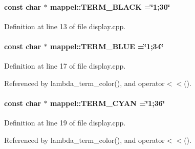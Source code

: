 \paragraph[{\texorpdfstring{T\+E\+R\+M\+\_\+\+B\+L\+A\+CK}{TERM_BLACK}}]{\setlength{\rightskip}{0pt plus 5cm}const char $\ast$ mappel\+::\+T\+E\+R\+M\+\_\+\+B\+L\+A\+CK =\char`\"{}1;30\char`\"{}}\hypertarget{namespacemappel_a448ca8ea08b3b9cdf522884ac004d901}{}\label{namespacemappel_a448ca8ea08b3b9cdf522884ac004d901}


Definition at line 13 of file display.\+cpp.

\paragraph[{\texorpdfstring{T\+E\+R\+M\+\_\+\+B\+L\+UE}{TERM_BLUE}}]{\setlength{\rightskip}{0pt plus 5cm}const char $\ast$ mappel\+::\+T\+E\+R\+M\+\_\+\+B\+L\+UE =\char`\"{}1;34\char`\"{}}\hypertarget{namespacemappel_a04365b9f87e9c572c79e2da4ff4a0378}{}\label{namespacemappel_a04365b9f87e9c572c79e2da4ff4a0378}


Definition at line 17 of file display.\+cpp.



Referenced by lambda\+\_\+term\+\_\+color(), and operator$<$$<$().

\paragraph[{\texorpdfstring{T\+E\+R\+M\+\_\+\+C\+Y\+AN}{TERM_CYAN}}]{\setlength{\rightskip}{0pt plus 5cm}const char $\ast$ mappel\+::\+T\+E\+R\+M\+\_\+\+C\+Y\+AN =\char`\"{}1;36\char`\"{}}\hypertarget{namespacemappel_ad7696c53e61084d23f8532598b261c36}{}\label{namespacemappel_ad7696c53e61084d23f8532598b261c36}


Definition at line 19 of file display.\+cpp.



Referenced by lambda\+\_\+term\+\_\+color(), and operator$<$$<$().

